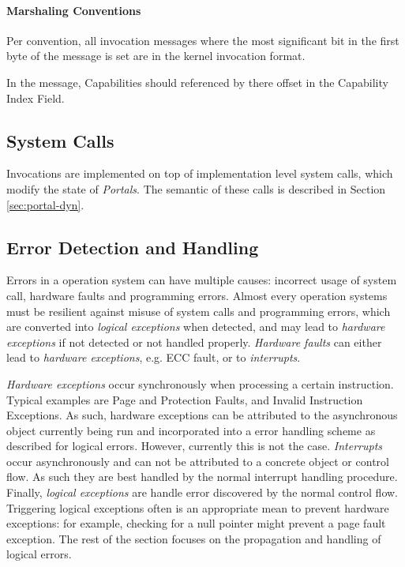 \paragraph{Marshaling Conventions}

Per convention, all invocation messages where the most significant bit in the first byte of the message is set are in the kernel invocation format.

In the message, Capabilities should referenced by there offset in the Capability Index Field.

\subsection{System Calls}
\label{sec:system-calls-impl}



Invocations are implemented on top of implementation level system calls, which modify the state of \emph{Portals}. The semantic of these calls is described in Section \ref{sec:portal-dyn}.

\subsection{Error Detection and Handling}
\label{sec:error-handling}

Errors in a operation system can have multiple causes: incorrect usage of system call, hardware faults and programming errors.
Almost every operation systems must be resilient against misuse of system calls and programming errors, which are converted into \emph{logical exceptions} when detected, and may lead to \emph{hardware exceptions} if not detected or not handled properly. \emph{Hardware faults} can either lead to \emph{hardware exceptions}, e.g. ECC fault, or to \emph{interrupts}.

\emph{Hardware exceptions} occur synchronously when processing a certain instruction. Typical examples are Page and Protection Faults, and Invalid Instruction Exceptions.
As such, hardware exceptions can be attributed to the asynchronous object currently being run and incorporated into a error handling scheme as described for logical errors. However, currently this is not the case. \emph{Interrupts} occur asynchronously and can not be attributed to a concrete object or control flow. As such they are best handled by the normal interrupt handling procedure.
Finally, \emph{logical exceptions} are handle error discovered by the normal control flow. Triggering logical exceptions often is an appropriate mean to prevent hardware exceptions: for example, checking for a null pointer might prevent a page fault exception. The rest of the section focuses on the propagation and handling of logical errors.

